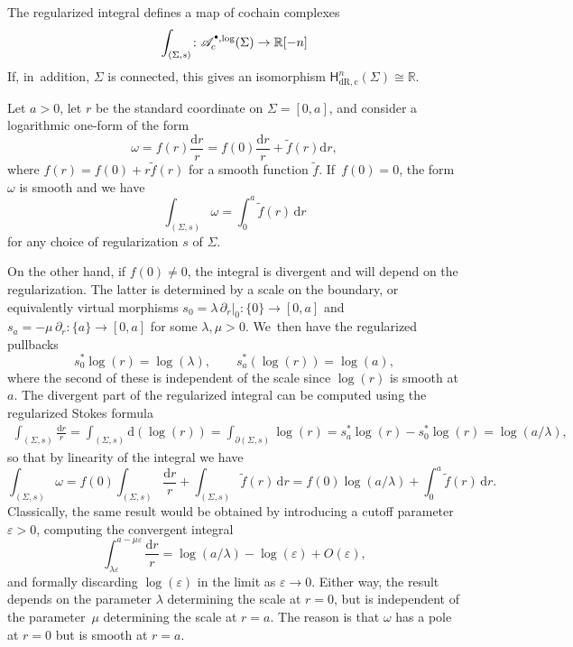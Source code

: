 \documentclass[JEP,XML,SOM,Unicode,NoFloatCountersInSection,published]{cedram}
\let\oldbullet\bullet
\renewcommand{\bullet}{{\raisebox{1pt}{$\scriptscriptstyle\oldbullet$}}}
\theoremstyle{definition}
\theoremstyle{remark}
\newenvironment{example}
  {\pushQED{\qed}\renewcommand{\qedsymbol}{$\lozenge$}\examplex}
  {\popQED\endexamplex}
\newcommand{\RR}{\mathbb{R}}
\newcommand{\tf}{\widetilde{f}}
\let\epsilon\varepsilon
\newcommand{\dd}{\mathrm{d}}
\newcommand{\dlog}[1]{\frac{\dd#1}{#1}}
\newcommand{\Alogc}[2][\bullet]{\mathscr{A}^{#1,\log}_c(#2)}
\newcommand{\cvf}[1]{\partial_{#1}}
\newcommand{\Sig}{\Sigma}
\newcommand{\HdRc}[2][\bullet]{\mathsf{H}_{\mathrm{dR},\mathrm{c}}^{#1}(#2)}
\begin{document}
\begin{corollary}
The regularized integral defines a map of cochain complexes
\[
\int_{(\Sig,s)} \colon \Alogc{\Sig} \to \RR[-n]
\]
If, in~addition, $\Sig$ is connected, this gives an isomorphism $\HdRc[n]{\Sig} \cong \RR.$
\end{corollary}

\begin{example}\label{ex:regint-interval}
Let $a>0$, let $r$ be the standard coordinate on $\Sig = [0,a]$, and consider a logarithmic one-form of the form
\[
\omega = f(r)\dlog{r} = f(0)\dlog{r} + \tf(r)\dd r,
\]
where $f(r) = f(0) + r \tf(r)$ for a smooth function $\tf$. If~$f(0)=0$, the form $\omega$ is smooth and we have
\[
\int_{(\Sig,s)} \omega = \int_0^a \tf(r)\,\dd r
\]
for any choice of regularization $s$ of $\Sig$.

On the other hand, if $f(0) \neq 0$, the integral is divergent and will depend on the regularization. The latter is determined by a scale on the boundary, or equivalently virtual morphisms $s_0 = \lambda\,\cvf{r}|_0 \colon \{0\} \to [0,a]$ and $s_a = -\mu\,\cvf{r}\colon \{a\} \to [0,a]$ for some $\lambda,\mu>0$. We~then have the regularized pullbacks
\[
s_0^* \log(r) = \log(\lambda),\qquad s_a^*(\log(r)) = \log(a),
\]
where the second of these is independent of the scale since $\log(r)$ is smooth at $a$.
The divergent part of the regularized integral can be computed using the regularized Stokes formula
\begin{align*}
\int_{(\Sig,s)} \dlog{r} = \int_{(\Sig,s)} \dd(\log(r))
= \int_{\partial(\Sig,s)} \log(r)
= s_a^*\log(r)-s_0^*\log(r)
= \log(a/\lambda),
\end{align*}
so that by linearity of the integral we have
\[
\int_{(\Sig,s)}\omega = f(0) \int_{(\Sig,s)} \dlog{r} + \int_{(\Sig,s)} \tf(r)\,\dd r = f(0) \log(a/\lambda) + \int_0^a \tf(r)\,\dd r.
\]
Classically, the same result would be obtained by introducing a cutoff parameter $\epsilon>0$, computing the convergent integral
\[
\int_{\lambda\epsilon}^{a-\mu\epsilon} \dlog{r} = \log(a/\lambda)-\log(\epsilon) + O(\epsilon),
\]
and formally discarding $\log(\epsilon)$ in the limit as $\epsilon\to 0$. Either way, the result depends on the parameter $\lambda$ determining the scale at $r=0$, but is independent of the parameter~$\mu$ determining the scale at $r=a$. The reason is that $\omega$ has a pole at $r=0$ but is smooth at $r=a$.
\end{example}
\end{document}

